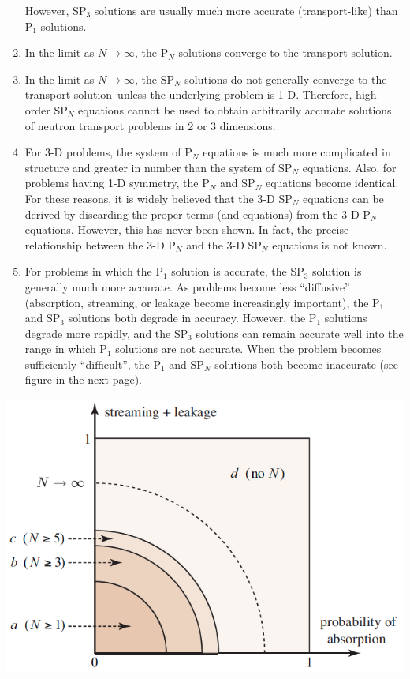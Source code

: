 \documentclass[12pt]{article}
\begin{document}
\begin{enumerate}
However, SP$_3$ solutions are usually much more accurate (transport-like) than P$_1$ solutions.
\item In the limit as $N\rightarrow\infty$, the P$_N$ solutions converge to the transport solution.
\item In the limit as $N\rightarrow\infty$, the SP$_N$ solutions do not generally converge to the transport solution--unless the underlying problem is 1-D.
Therefore, high-order SP$_N$ equations cannot be used to obtain arbitrarily accurate solutions of neutron transport problems in 2 or 3 dimensions.
\item For 3-D problems, the system of P$_N$ equations is much more complicated in structure and greater in number than the system of SP$_N$ equations.
Also, for problems having 1-D symmetry, the P$_N$ and SP$_N$ equations become identical.
For these reasons, it is widely believed that the 3-D SP$_N$ equations can be derived by discarding the proper terms (and equations) from the 3-D P$_N$ equations. However, this has never been shown.
In fact, the precise relationship between the 3-D P$_N$ and the 3-D SP$_N$ equations is not known.
\item For problems in which the P$_1$ solution is accurate, the SP$_3$ solution is generally much more accurate.
As problems become less ``diffusive'' (absorption, streaming, or leakage become increasingly important), the P$_1$ and SP$_3$ solutions both degrade in accuracy.
However, the P$_1$ solutions degrade more rapidly, and the SP$_3$ solutions can
remain accurate well into the range in which P$_1$ solutions are not accurate.
When the problem becomes sufficiently ``difficult'', the P$_1$ and SP$_N$ solutions both become inaccurate (see figure in the next page).
\end{enumerate}

\newpage

\begin{center}
\includegraphics[scale=0.7]{fig_spn}
\end{center}
\end{document}
